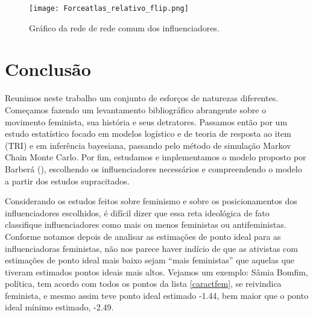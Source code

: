 \documentclass[
	12pt,				%
	openright,			%
	twoside,			%
	a4paper,			%
	english,			%
	brazil				%
	]{abntex2}
\begin{document}
 \begin{sidewaysfigure}[ht]
    \texttt{[image: Forceatlas\_relativo\_flip.png]}
    \caption{Gráfico da rede de rede comum dos influenciadores.}
    \label{networkforceatlas}
 \end{sidewaysfigure}
 
 
 
 


 \chapter{Conclusão}
 Reunimos neste trabalho um conjunto de esforços de naturezas diferentes. Começamos fazendo um levantamento bibliográfico abrangente sobre o movimento feminista, sua história e seus detratores. Passamos então por um estudo estatístico focado em modelos logístico e de teoria de resposta ao item (TRI) e em inferência bayesiana, passando pelo método de simulação Markov Chain Monte Carlo. Por fim, estudamos e implementamos o modelo proposto por Barberá (\citeyear{barbera2015}), escolhendo os influenciadores necessários e compreendendo o modelo a partir dos estudos supracitados.
 
 Considerando os estudos feitos sobre feminismo e sobre os posicionamentos dos influenciadores escolhidos, é difícil dizer que essa reta ideológica de fato classifique influenciadores como mais ou menos feministas ou antifeministas. Conforme notamos depois de analisar as estimações de ponto ideal para as influenciadoras feministas, não nos parece haver indício de que as ativistas com estimações de ponto ideal mais baixo sejam ``mais feministas'' que aquelas que tiveram estimados pontos ideais mais altos. Vejamos um exemplo: Sâmia Bomfim, política, tem acordo com todos os pontos da lista \ref{caractfem}, se reivindica feminista, e mesmo assim teve ponto ideal estimado -1.44, bem maior que o ponto ideal mínimo estimado, -2.49. 
 
\end{document}
